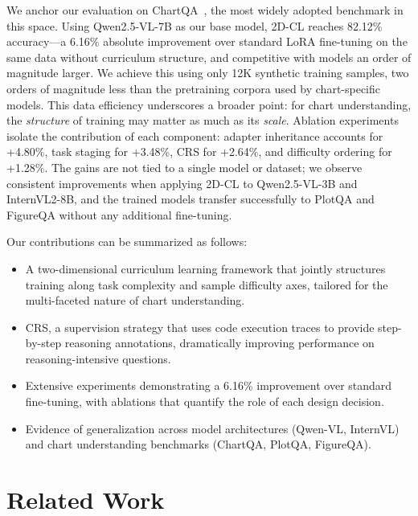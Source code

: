 ﻿\documentclass[journal]{IEEEtran}
\newcommand{\method}{2D-CL}
\newcommand{\crs}{CRS}
\begin{document}
We anchor our evaluation on ChartQA~\cite{masry2022chartqa}, the most widely adopted benchmark in this space. Using Qwen2.5-VL-7B as our base model, \method{} reaches 82.12\% accuracy---a 6.16\% absolute improvement over standard LoRA fine-tuning on the same data without curriculum structure, and competitive with models an order of magnitude larger. We achieve this using only 12K synthetic training samples, two orders of magnitude less than the pretraining corpora used by chart-specific models. This data efficiency underscores a broader point: for chart understanding, the \emph{structure} of training may matter as much as its \emph{scale}. Ablation experiments isolate the contribution of each component: adapter inheritance accounts for +4.80\%, task staging for +3.48\%, \crs{} for +2.64\%, and difficulty ordering for +1.28\%. The gains are not tied to a single model or dataset; we observe consistent improvements when applying \method{} to Qwen2.5-VL-3B and InternVL2-8B, and the trained models transfer successfully to PlotQA and FigureQA without any additional fine-tuning.

Our contributions can be summarized as follows:
\begin{itemize}
    \item A two-dimensional curriculum learning framework that jointly structures training along task complexity and sample difficulty axes, tailored for the multi-faceted nature of chart understanding.
    \item \crs{}, a supervision strategy that uses code execution traces to provide step-by-step reasoning annotations, dramatically improving performance on reasoning-intensive questions.
    \item Extensive experiments demonstrating a 6.16\% improvement over standard fine-tuning, with ablations that quantify the role of each design decision.
    \item Evidence of generalization across model architectures (Qwen-VL, InternVL) and chart understanding benchmarks (ChartQA, PlotQA, FigureQA).
\end{itemize}

\section{Related Work}
\end{document}
